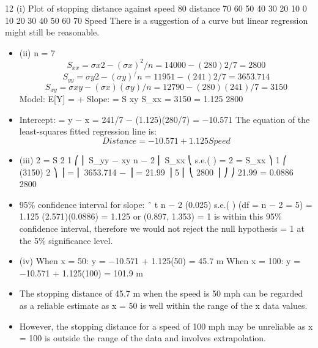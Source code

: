 \documentclass[a4paper,12pt]{article}
\begin{document}
12
(i)
Plot of stopping distance against speed
80
distance
70
60
50
40
30
20
10
0
10
20
30
40
50
60
70
Speed
There is a suggestion of a curve but linear regression might still be reasonable.
\begin{itemize}
\item (ii)
n = 7
\[S_{xx}= \sigma x 2 − (\sigma x)^2 /n = 14000 − (280) 2 /7 = 2800\]
\[S_{yy} = \sigma y 2 − (\sigma y)^ /n = 11951 − (241) 2 /7 = 3653.714\]
\[S_{xy} = \sigma xy − (\sigma x)( \sigma y)/n = 12790 − (280)(241)/7 = 3150\]
Model: E[Y] = \alpha + \betax
Slope:\hat{\beta}  =
S xy
S_{xx}
=
3150
= 1.125
2800
\item 
Intercept: \hat{\alpha} = y −\hat{\beta}  x = 241/7 − (1.125)(280/7) = −10.571
The equation of the least-squares fitted regression line is:
\[Distance = −10.571 + 1.125 Speed\]
\item (iii)
\hat{\sigma } 2 =
S 2
1 ⎛
⎜ S_{yy} − xy
n − 2 ⎜
S_{xx}
⎝
s.e.( \hat{\beta} ) =
\hat{\sigma } 2
=
S_{xx}
⎞ 1 ⎛
(3150) 2 ⎞
⎟ = ⎜ 3653.714 −
⎟ = 21.99
⎟ 5 ⎜ ⎝
2800 ⎟ ⎠
⎠
21.99
= 0.0886
2800
\item 95\% confidence interval for slope:
\beta ˆ \pm t n − 2 (0.025) s.e.( \hat{\beta} )
(df = n − 2 = 5)
= 1.125 \pm (2.571)(0.0886) = 1.125  or (0.897, 1.353)
\beta = 1 is within this 95\% confidence interval, therefore we would not reject the null hypothesis \beta = 1 at the 5\% significance level.
\item (iv)
When x = 50: y = −10.571 + 1.125(50) = 45.7 m
When x = 100: y = −10.571 + 1.125(100) = 101.9 m
\item The stopping distance of 45.7 m when the speed is 50 mph can be regarded as a reliable estimate as x = 50 is well within the range of the x data values.
\item However, the stopping distance for a speed of 100 mph may be unreliable as x = 100 is outside the range of the data and involves extrapolation.

\end{itemize}

\end{document}

